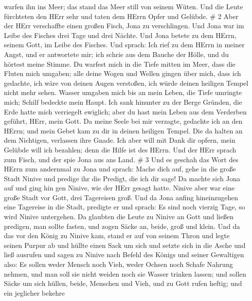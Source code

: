 warfen ihn ins Meer; das stand das Meer still von seinem Wüten.
 Und die Leute fürchteten den HErr sehr und taten dem HErrn
Opfer und Gelübde. \# 2  Aber der HErr verschaffte einen
großen Fisch, Jona zu verschlingen. Und Jona war im Leibe des Fisches
drei Tage und drei Nächte.  Und Jona betete zu dem HErrn,
seinem Gott, im Leibe des Fisches.  Und sprach: Ich rief zu
dem HErrn in meiner Angst, und er antwortete mir; ich schrie aus dem
Bauche der Hölle, und du hörtest meine Stimme.  Du warfest
mich in die Tiefe mitten im Meer, dass die Fluten mich umgaben; alle
deine Wogen und Wellen gingen über mich,  dass ich gedachte,
ich wäre von deinen Augen verstoßen, ich würde deinen heiligen Tempel
nicht mehr sehen.  Wasser umgaben mich bis an mein Leben,
die Tiefe umringte mich; Schilf bedeckte mein Haupt.  Ich
sank hinunter zu der Berge Gründen, die Erde hatte mich verriegelt
ewiglich; aber du hast mein Leben aus dem Verderben geführt, HErr, mein
Gott.  Da meine Seele bei mir verzagte, gedachte ich an den
HErrn; und mein Gebet kam zu dir in deinen heiligen Tempel. 
Die da halten an dem Nichtigen, verlassen ihre Gnade.  Ich
aber will mit Dank dir opfern, mein Gelübde will ich bezahlen; denn die
Hilfe ist des HErrn.  Und der HErr sprach zum Fisch, und
der spie Jona aus ans Land. \# 3  Und es geschah das Wort
des HErrn zum andernmal zu Jona und sprach:  Mache dich auf,
gehe in die große Stadt Ninive und predige ihr die Predigt, die ich dir
sage!  Da machte sich Jona auf und ging hin gen Ninive, wie
der HErr gesagt hatte. Ninive aber war eine große Stadt vor Gott, drei
Tagereisen groß.  Und da Jona anfing hineinzugehen eine
Tagereise in die Stadt, predigte er und sprach: Es sind noch vierzig
Tage, so wird Ninive untergehen.  Da glaubten die Leute zu
Ninive an Gott und ließen predigen, man sollte fasten, und zogen Säcke
an, beide, groß und klein.  Und da das vor den König zu
Ninive kam, stand er auf von seinem Thron und legte seinen Purpur ab und
hüllte einen Sack um sich und setzte sich in die Asche  und
ließ ausrufen und sagen zu Ninive nach Befehl des Königs und seiner
Gewaltigen also: Es sollen weder Mensch noch Vieh, weder Ochsen noch
Schafe Nahrung nehmen, und man soll sie nicht weiden noch sie Wasser
trinken lassen;  und sollen Säcke um sich hüllen, beide,
Menschen und Vieh, und zu Gott rufen heftig; und ein jeglicher bekehre
